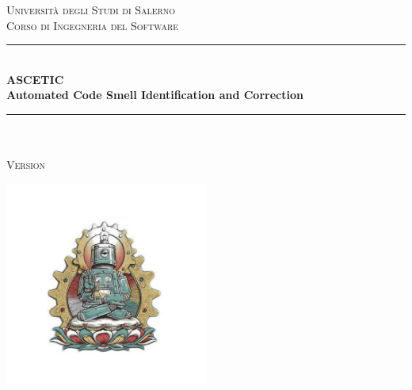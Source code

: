 	\begin{titlepage} %
		\newcommand{\HRule}{\rule{\linewidth}{0.5mm}} %
		
		\center %
		
		
		\textsc{\LARGE Università degli Studi di Salerno}\\
		\textsc{\large Corso di Ingegneria del Software}\\[1.5cm] %
		
		
		\HRule\\[0.4cm]
		
		{\huge\bfseries ASCETIC}\\ %
		\vspace{0.2cm}
		{\large\bfseries Automated Code Smell Identification and Correction}\\[0.2cm] %
		
		\HRule\\[1.5cm]
		
		\textsc{\Large \doctitle}\\[0.3cm] %
		
		\textsc{\large Version \docversion}\\[0.5cm] %
		
		
		
		\vfill\vfill
		
		\includegraphics[width=0.5\textwidth]{../logo_temp.jpg}\\[1cm] %
		

\end{titlepage}
